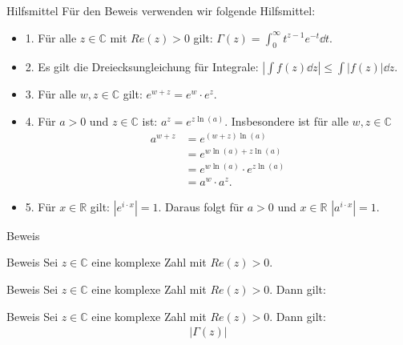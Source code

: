 \documentclass[10pt]{beamer}
\def\bC{\mathbb{C}}
\def\bR{\mathbb{R}}
\begin{document}
\begin{frame}{Hilfsmittel}
    Für den Beweis verwenden wir folgende Hilfsmittel:
    \begin{itemize}
        \item<1->  1. Für alle \( z \in \bC \) mit \( Re( z ) > 0 \) gilt: \( \Gamma( z ) = \int_{0}^{\infty} t^{z - 1} e^{-t} \dd{t} \).
        \item<2->  2. Es gilt die Dreiecksungleichung für Integrale: \( \left\vert \int f( z ) \dd{z} \right\vert \leq \int \left\vert f( z ) \right\vert \dd{z} \).
        \item<3->  3. Für alle \( w, z \in \bC \) gilt: \( e^{w + z} = e^{w} \cdot e^{z} \).
        \item<4->  4. Für \( a > 0 \) und \( z \in \bC \) ist: \( a^{z} = e^{z \ln(a)} \). Insbesondere ist für alle \( w, z \in \bC \)
        \begin{align*}
            a^{w + z} 
            & = e^{\left( w + z \right) \ln(a)} \\
            & = e^{w \ln(a) + z \ln(a)} \\
            & = e^{w \ln(a)} \cdot e^{z \ln(a)} \\
            & = a^{w} \cdot a^{z}.
        \end{align*}
        \item<5->  5. Für \( x \in \bR \) gilt: \( \left\vert e^{i \cdot x} \right\vert = 1 \). Daraus folgt für \( a > 0 \) und \( x \in \bR \) \( \left\vert a^{i \cdot x} \right\vert = 1 \).
    \end{itemize}
\end{frame}



\begin{frame}{Beweis}
    
\end{frame}



\begin{frame}{Beweis}
    Sei \( z \in \bC \) eine komplexe Zahl mit \( Re(z) > 0 \).
\end{frame}



\begin{frame}{Beweis}
    Sei \( z \in \bC \) eine komplexe Zahl mit \( Re(z) > 0 \). Dann gilt:
\end{frame}



\begin{frame}{Beweis}
    Sei \( z \in \bC \) eine komplexe Zahl mit \( Re(z) > 0 \). Dann gilt:
    \begin{align*}
        \left\vert \Gamma( z ) \right\vert
    \end{align*}
\end{frame}
\end{document}
